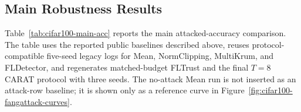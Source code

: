\documentclass{article}
\begin{document}
\subsection{Main Robustness Results}

Table~\ref{tab:cifar100-main-acc} reports the main attacked-accuracy comparison. The table uses the reported public baselines described above, reuses protocol-compatible five-seed legacy logs for Mean, NormClipping, MultiKrum, and FLDetector, and regenerates matched-budget FLTrust and the final $T=8$ CARAT protocol with three seeds. The no-attack Mean run is not inserted as an attack-row baseline; it is shown only as a reference curve in Figure~\ref{fig:cifar100-fangattack-curves}.

\begin{table}[!htbp]
\centering
\caption{Final test accuracy (\%) for the reported public baselines under four model-poisoning attacks on CIFAR-100/ResNet18 with $20\%$ malicious clients and non-i.i.d.\ client partitions. Higher accuracy is better, and lower average rank is better. Legacy public-baseline rows reuse five-seed logs where available; FLTrust and CARAT are regenerated under the reference-assisted protocol with three seeds and matched reference budgets.}
\label{tab:cifar100-main-acc}
\renewcommand{\arraystretch}{1.08}
\setlength{\tabcolsep}{4.2pt}
\small
{}
\end{table}
\end{document}
